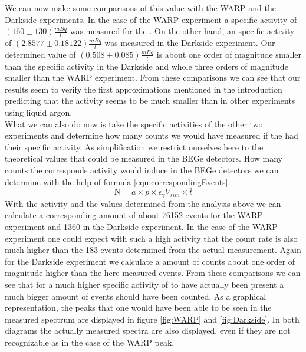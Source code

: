\documentclass[encoding=utf8,british]{tumphthesis}
\begin{document}
We can now make some comparisons of this value with the WARP and the Darkside experiments.
In the case of the WARP experiment a specific activity of $(160\pm130)\frac{\unit{mBq}}{\unit{l}}$ \label{} was measured for the \Kr.
On the other hand, an specific activity of $(2.8577 \pm 0.18122) \frac{\unit{mBq}}{\unit{l}}$ was measured in the Darkside experiment.
Our determined value of $(0.508\pm0.085)\frac{\unit{mBq}}{\unit{l}}$ is about one order of magnitude smaller than the specific activity in the Darkside and whole three orders of magnitude smaller than the WARP experiment.
From these comparisons we can see that our results seem to verify the first approximations mentioned in the introduction predicting that the \Kr activity seems to be much smaller than in other experiments using liquid argon.
\\

What we can also do now is take the specific activities of the other two experiments and determine how many counts we would have measured if the \Kr had their specific activity.
As simplification we restrict ourselves here to the theoretical values that could be measured in the BEGe detectors. 
How many counts the corresponds activity would induce in the BEGe detectors we can determine with the help of formula \ref{equ:correspondingEvents}.
\begin{equation}
\mathrm{N} = \bar{a} \times p \times \epsilon_\gamma V_{sim} \times \bar{t}
\label{equ:correspondingEvents}
\end{equation}
With the activity and the values determined from the analysis above we can calculate a corresponding amount of about 76152 events for the WARP experiment and 1360 in the Darkside experiment.
In the case of the WARP experiment one could expect with such a high activity that the count rate is also much higher than the 183 events determined from the actual measurement.
Again for the Darkside experiment we calculate a amount of counts about one order of magnitude higher than the here measured events.
From these comparisons we can see that for a much higher specific activity of \Kr to have actually been present a much bigger amount of events should have been counted.
As a graphical representation, the peaks that one would have been able to be seen in the measured spectrum are displayed in figure \ref{fig:WARP} and \ref{fig:Darkside}.
In both diagrams the actually measured spectra are also displayed, even if they are not recognizable as in the case of the WARP peak.
\\
\end{document}
